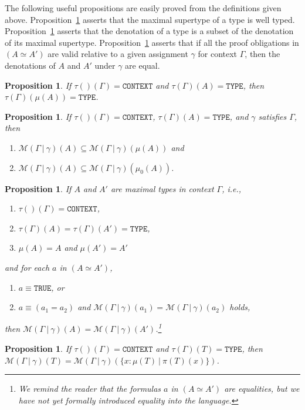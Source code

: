 \documentclass [12pt,twoside]{cslreport}
\newtheorem{prop}[thm]{Proposition}
\newcommand{\tauGamma}[1]{\tau(\Gamma)(#1)}
\newcommand{\Mgamma}[1]{{\mathcal M}(\Gamma\vbar\gamma)(#1)}
\newcommand{\tttrue}{\mathtt{TRUE}}
\newcommand{\tttype}{\mathtt{TYPE}}
\newcommand{\ttcontext}{\mathtt{CONTEXT}}
\newcommand{\vbar}{\ |\ }
\begin{document}
The following useful propositions are easily proved from the definitions
given above.   Proposition~\ref{max-type-correct} asserts that the
maximal supertype of a type is well typed.  Proposition~\ref{maximal-subset}
asserts that the denotation of a type is a subset of the denotation of its
maximal supertype.  Proposition~\ref{maximal-equality} asserts that
if all the proof obligations in $(A\simeq A')$ are valid relative to
a given assignment $\gamma$ for context $\Gamma$, then
the denotations of $A$ and $A'$ under $\gamma$ are equal. 
%
\begin{prop}\label{max-type-correct}
  If $\tau()(\Gamma) = \ttcontext$ and
  $\tauGamma{A} = \tttype{}$, then $\tauGamma{\mu(A)} = \tttype{}$.
\end{prop}
\begin{prop}\label{maximal-subset}
  If $\tau()(\Gamma) = \ttcontext$, 
    $\tauGamma{A} = \tttype{}$,
   and $\gamma$ satisfies $\Gamma$, 
then
\begin{enumerate}
\item   $\Mgamma{A} \subseteq \Mgamma{\mu(A)}$ and
\item   $\Mgamma{A} \subseteq \Mgamma{\mu_0(A)}$.
\end{enumerate}
\end{prop}
\begin{prop}\label{maximal-equality}
  If $A$ and $A'$ are maximal
types in context $\Gamma$, i.e.,
\begin{enumerate}
\item $\tau()(\Gamma) = \ttcontext$, 
\item $\tauGamma{A} = \tauGamma{A'} = \tttype{}$,
\item $\mu(A) = A$ and $\mu(A') = A'$
\end{enumerate}
and
 for each $a$  in $(A \simeq A')$, %
\begin{enumerate}
\item $a\equiv \tttrue$, or 
\item $a\equiv (a_1 = a_2)$ and $\Mgamma{a_1} = \Mgamma{a_2}$
holds,
\end{enumerate}
then $\Mgamma{A} = \Mgamma{A'}$.\footnote{ 
We remind the reader that the formulas $a$ in $(A\simeq A')$ are equalities,
but we have not yet formally introduced equality into the language.   } 
\end{prop}
\begin{prop}\label{maximal-subtype}
If $\tau()(\Gamma) = \ttcontext$ and $\tauGamma{T} = \tttype$,
then $\Mgamma{T} = \Mgamma{\{x : \mu(T) \vbar \pi(T)(x)\}}$.
\end{prop}
\end{document}
